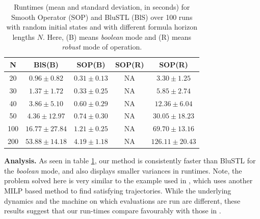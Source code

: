 \begin{exmp}
\begin{table}[tb]
\small
\begin{center}
\caption{{\small Runtimes (mean and standard deviation, in seconds) for Smooth Operator (SOP) and BluSTL (BlS) over 100 runs with random initial states and with different formula horizon lengths $N$. Here, (B) means \textit{boolean} mode and (R) means \textit{robust} mode of operation.}}
\vspace{-5pt}
\label{tbl:time_performance_toy}
\begin{tabular} {|c|c|c|c|c|}
	\hline
	N & BlS(B) & SOP(B) & SOP(R) & SOP(R) \\ \hline
	20 & $0.96 \pm 0.82$ &  $\mathbf{0.31 \pm 0.13}$  & NA & $3.30 \pm 1.25$ \\ \hline
	30 & $1.37 \pm 1.72$ &  $\mathbf{0.33 \pm 0.25}$  & NA & $5.85 \pm 2.74$\\ \hline
	40 & $3.86 \pm 5.10$ &  $\mathbf{0.60 \pm 0.29}$  & NA & $12.36 \pm 6.04$\\ \hline
	50 & $4.36 \pm 12.97$&  $\mathbf{0.74 \pm 0.30}$ & NA & $30.05 \pm 18.23$\\ \hline
	100& $16.77 \pm 27.84$ & $\mathbf{1.21 \pm 0.25}$ & NA & $69.70 \pm 13.16$ \\ \hline
	200& $53.88 \pm 14.18$& $\mathbf{4.19 \pm 1.18}$ & NA & $126.11 \pm 20.43$ \\ \hline
\end{tabular}	
\end{center}
\end{table}

\textbf{Analysis.}
As seen in table \ref{tbl:time_performance_toy}, our method is consistently faster than BluSTL for the \textit{boolean} mode, and also displays smaller variances in runtimes. Note, the problem solved here is very similar to the example used in \cite{Saha_acc16}, which uses another MILP based method to find satisfying trajectories. While the underlying dynamics and the machine on which evaluations are run are different, these results suggest that our run-times compare favourably with those in \cite{Saha_acc16}.


\end{exmp}
